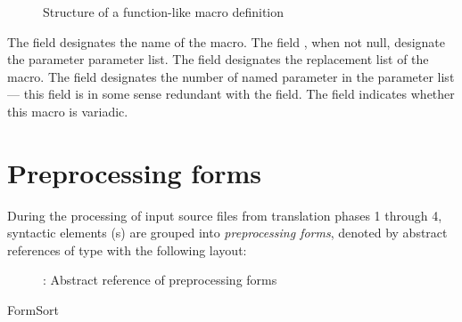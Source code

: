 \begin{figure}[H]
    \centering
    \caption{Structure of a function-like macro definition}
    \label{fig:ifc-function-like-macro-structure}
\end{figure}

The field  designates the name of the macro.  The field , when not null,
designate the parameter parameter list.  The field  designates the replacement list of the macro.
The field  designates the number of named parameter in the parameter list --- this field is in
some sense redundant with the  field.  The field  indicates whether
this macro is variadic.



\section{Preprocessing forms}
\label{sec:ifc-pp-forms}

During the processing of input source files from translation phases 1 through 4, 
syntactic elements (s) 
are grouped into \emph{preprocessing forms},
denoted by abstract references of type  with the following layout:
%
\begin{figure}[htbp]
  \centering
  \caption{: Abstract reference of preprocessing forms}
  \label{fig:ifc-form-index}
\end{figure}
%

\begin{SortEnum}{FormSort}
\end{SortEnum}

